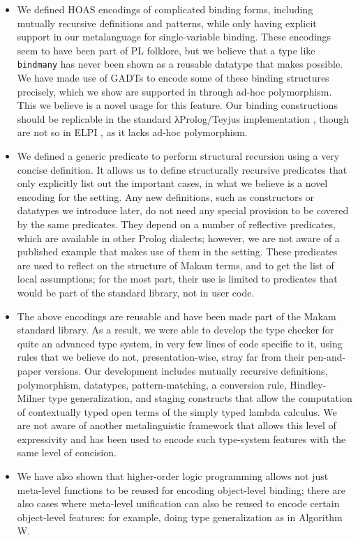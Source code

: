 \begin{itemize}
\item
  We defined HOAS encodings of complicated binding forms, including
  mutually recursive definitions and patterns, while only having
  explicit support in our metalanguage for single-variable binding.
  These encodings seem to have been part of PL folklore, but we believe
  that a type like \texttt{bindmany} has never been shown as a reusable
  datatype that \lamprolog makes possible. We have made use of GADTs to
  encode some of these binding structures precisely, which we show are
  supported in \lamprolog through ad-hoc polymorphism. This we believe
  is a novel usage for this \lamprolog feature. Our binding
  constructions should be replicable in the standard \foreignlanguage{greek}{λ}Prolog/Teyjus
  implementation \citep{teyjus-main-reference}, though are not so in
  ELPI \citep{elpi-main-reference}, as it lacks ad-hoc polymorphism.
\item
  We defined a generic predicate to perform structural recursion using a
  very concise definition. It allows us to define structurally recursive
  predicates that only explicitly list out the important cases, in what
  we believe is a novel encoding for the \lamprolog
   setting. Any new definitions, such as constructors or datatypes we
  introduce later, do not need any special provision to be covered by
  the same predicates. They depend on a number of reflective predicates,
  which are available in other Prolog dialects; however, we are not
  aware of a published example that makes use of them in the \lamprolog
   setting. These predicates are used to reflect on the structure of
  Makam terms, and to get the list of local assumptions; for the most
  part, their use is limited to predicates that would be part of the
  standard library, not in user code.
\item
  The above encodings are reusable and have been made part of the Makam
  standard library. As a result, we were able to develop the type
  checker for quite an advanced type system, in very few lines of code
  specific to it, using rules that we believe do not, presentation-wise,
  stray far from their pen-and-paper versions. Our development includes
  mutually recursive definitions, polymorphism, datatypes,
  pattern-matching, a conversion rule, Hindley-Milner type
  generalization, and staging constructs that allow the computation of
  contextually typed open terms of the simply typed lambda calculus. We
  are not aware of another metalinguistic framework that allows this
  level of expressivity and has been used to encode such type-system
  features with the same level of concision.
\item
  We have also shown that higher-order logic programming allows not just
  meta-level functions to be reused for encoding object-level binding;
  there are also cases where meta-level unification can also be reused
  to encode certain object-level features: for example, doing type
  generalization as in Algorithm W.
\end{itemize}

